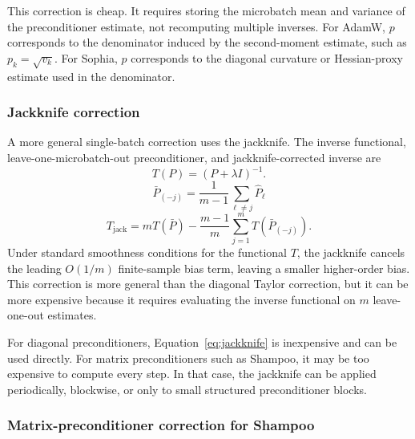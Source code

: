 \documentclass{article}
\begin{document}
This correction is cheap. It requires storing the microbatch mean and variance of the preconditioner estimate, not recomputing multiple inverses. For AdamW, $p$ corresponds to the denominator induced by the second-moment estimate, such as $p_k=\sqrt{v_k}$. For Sophia, $p$ corresponds to the diagonal curvature or Hessian-proxy estimate used in the denominator.

\subsubsection{Jackknife correction}
\label{app:jackknife-correction}

A more general single-batch correction uses the jackknife. The inverse functional, leave-one-microbatch-out preconditioner, and jackknife-corrected inverse are
\begin{equation}
    T(P) = (P+\lambda I)^{-1}.
\end{equation}
\begin{equation}
    \bar P_{(-j)}
    =
    \frac{1}{m-1}\sum_{\ell \neq j}\hat P_\ell
\end{equation}
\begin{equation}
    T_{\mathrm{jack}}
    =
    m T(\bar P)
    -
    \frac{m-1}{m}\sum_{j=1}^m T(\bar P_{(-j)}).
    \label{eq:jackknife}
\end{equation}
Under standard smoothness conditions for the functional $T$, the jackknife cancels the leading $O(1/m)$ finite-sample bias term, leaving a smaller higher-order bias. This correction is more general than the diagonal Taylor correction, but it can be more expensive because it requires evaluating the inverse functional on $m$ leave-one-out estimates.

For diagonal preconditioners, Equation~\eqref{eq:jackknife} is inexpensive and can be used directly. For matrix preconditioners such as Shampoo, it may be too expensive to compute every step. In that case, the jackknife can be applied periodically, blockwise, or only to small structured preconditioner blocks.

\subsubsection{Matrix-preconditioner correction for Shampoo}
\end{document}
